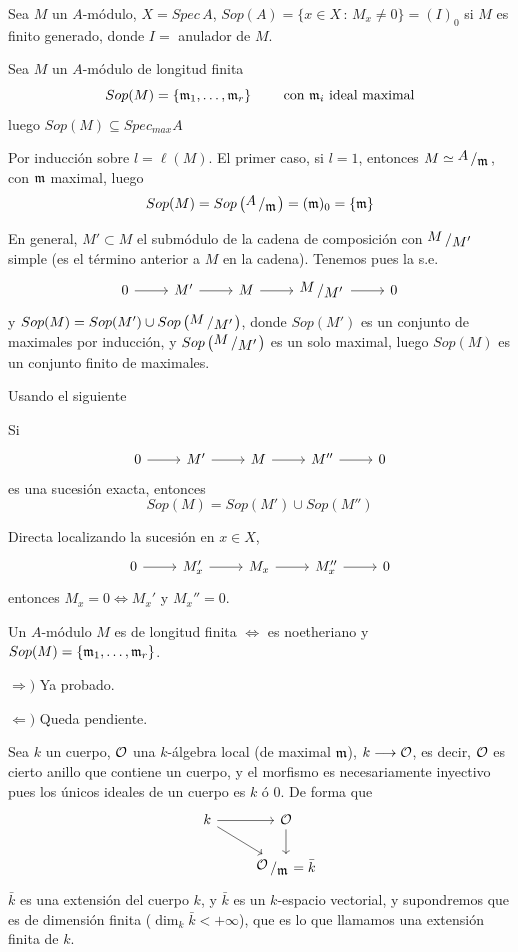 Sea $M$ un $A$-m\'odulo, $X=Spec\, A$, $Sop(A) = \{x\in X \, : \, M_x \neq 0\} = (I)_0$ si $M$ es finito generado, donde $I = $ anulador de $M$.  
\begin{prop}
    Sea $M$ un $A$-m\'odulo de longitud finita
    $$Sop(M) = \{ \mathfrak{m}_1, \ldots, \mathfrak{m}_r\} \qquad \text{ con } \mathfrak{m}_i \text{ ideal maximal}$$
    luego $Sop(M) \subseteq Spec_{max} A$
\end{prop}
\begin{dem}
    Por inducci\'on sobre $l=\ell(M)$. El primer caso, si $l=1$, entonces $M\simeq \modulo{A}{\m}$, con $\mathfrak{m}$ maximal, luego
    $$Sop(M) = Sop\left(\modulo{A}{\m}\right) = (\m)_0 = \{ \m \}$$

    En general, $M' \subset M$ el subm\'odulo de la cadena de composici\'on con $\modulo{M}{M'}$ simple (es el t\'ermino anterior a $M$ en la cadena).
    Tenemos pues la s.e.
    $$\bt 0 \rar & M'  \rar & M  \rar & \modulo{M}{M'}  \rar & 0 \et$$
    y $Sop(M) = Sop(M') \cup Sop\left( \modulo{M}{M'}\right)$, donde $Sop(M')$ es un conjunto de maximales por inducci\'on, y $Sop\left( \modulo{M}{M'}\right)$ es un solo maximal, luego $Sop(M)$ es un conjunto finito de maximales. 
\end{dem}
Usando el siguiente
\begin{lem} Si 
    $$\bt 0 \rar & M'  \rar & M  \rar & M'' \rar & 0 \et$$ es una sucesi\'on exacta, entonces
    $$Sop(M) = Sop(M') \cup Sop(M'') $$
\end{lem}
\begin{dem}
    Directa localizando la sucesi\'on en $x\in X$, 
    $$\bt 0 \rar & M'_x  \rar & M_x  \rar & M''_x \rar & 0 \et$$
    entonces $M_x = 0 \iff M_x'$ y $M_x'' = 0$.  
\end{dem}
\begin{teo}
    Un $A$-m\'odulo $M$ es de longitud finita $\iff$ es noetheriano y $Sop(M)= \{ \mathfrak{m}_1, \ldots, \mathfrak{m}_r\}$. 
\end{teo}
\begin{dem}
    $\Rightarrow)$ Ya probado.

    $\Leftarrow)$ Queda pendiente. 
\end{dem}

Sea $k$ un cuerpo, $\mathcal{O}$ una $k$-\'algebra local (de maximal $\mathfrak{m}$), $k \longrightarrow \mathcal{O}$, es decir, $\mathcal{O}$ es cierto anillo que contiene un cuerpo, y el morfismo es necesariamente inyectivo pues los \'unicos ideales de un cuerpo es $k$ \'o 0. De forma que 
$$\bt k \rar \arrow{dr} & \mc O \arrow{d} \\ & \modulo{\mc O}{\m } = \bar k\et$$
$\bar k$ es una extensi\'on del cuerpo $k$, y $\bar k$ es un $k$-espacio vectorial, y supondremos que es de dimensi\'on finita ($\dim_k \bar k < + \infty$), que es lo que llamamos una extensi\'on finita de $k$. 

